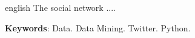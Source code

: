 \begin{resumo}[ABSTRACT]
 \begin{otherlanguage*}{english}
The social network ....

   
   \vspace{\onelineskip}
 
   \noindent 
   \textbf{Keywords}: Data. Data Mining. Twitter. Python.
 \end{otherlanguage*}
\end{resumo}
